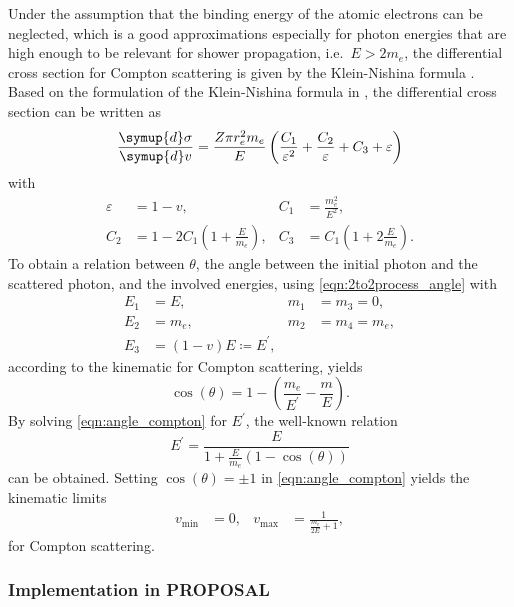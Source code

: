 Under the assumption that the binding energy of the atomic electrons can be neglected, which is a good approximations especially for photon energies that are high enough to be relevant for shower propagation, i.e.\ $E > 2 m_e$, the differential cross section for Compton scattering is given by the Klein-Nishina formula \cite{KleinNishina}.
Based on the formulation of the Klein-Nishina formula in \cite{Hirayama:2005zm}, the differential cross section can be written as
%
\begin{equation}
	\frac{\symup{d}\sigma}{\symup{d}v} = \frac{Z \pi r_e^2 m_e}{E} \left( \frac{C_1}{\varepsilon^2} + \frac{C_2}{\varepsilon} + C_3 + \varepsilon \right)
\end{equation}
%
with
%
\begin{align}
	\varepsilon &= 1 - v, & C_1 &= \frac{m_e^2}{E^2}, \\
	C_2 &= 1 - 2 C_1 \left( 1 + \frac{E}{m_e} \right) , & C_3 &= C_1 \left( 1 + 2 \frac{E}{m_e} \right).
\end{align}
%
To obtain a relation between $\theta$, the angle between the initial photon and the scattered photon, and the involved energies, using \eqref{eqn:2to2process_angle} with
%
\begin{align*}
	E_1 &= E, & m_1 &= m_3 = 0, \\
	E_2 &= m_e, & m_2 &= m_4 = m_e, \\
	E_3 &= (1 - v) E \coloneqq E^{\prime},
\end{align*}
%
according to the kinematic for Compton scattering, yields
%
\begin{equation}
	\label{eqn:angle_compton}
	\cos(\theta) = 1 - \left( \frac{m_e}{E^{\prime}} - \frac{m}{E} \right).
\end{equation}
%
By solving \eqref{eqn:angle_compton} for $E^{\prime}$, the well-known relation
%
\begin{equation}
	E^{\prime} = \frac{E}{1 + \frac{E}{m_e} (1 - \cos(\theta))}
\end{equation}
%
can be obtained.
Setting $\cos(\theta) = \pm1$ in \eqref{eqn:angle_compton} yields the kinematic limits
%
\begin{align}
	v_{\text{min}} &= 0, & v_{\text{max}} &= \frac{1}{\frac{m_e}{2E} + 1},
\end{align}
%
for Compton scattering.

\subsubsection{Implementation in PROPOSAL}

